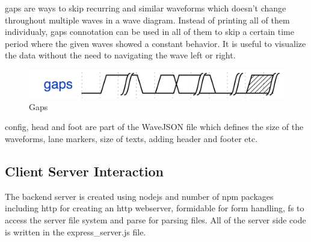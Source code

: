 \documentclass[14pt]{extarticle}
\begin{document}
gaps are ways to skip recurring and similar waveforms which doesn't change throughout multiple waves in a wave diagram. Instead of printing all of them individualy, gaps connotation can be used in all of them to skip a certain time period where the given waves showed a constant behavior. It is useful to visualize the data without the need to navigating the wave left or right.

\begin{figure}[H]
    \centering
    \includegraphics[scale=0.7]{gaps}
    \caption{Gaps}
    \label{fig:gaps}
\end{figure}

config, head and foot are part of the WaveJSON file which defines the size of the waveforms, lane markers, size of texts, adding header and footer etc.

\subsection{Client Server Interaction}
The backend server is created using nodejs and number of npm packages including http for creating an http webserver, formidable for form handling, fs to access the server file system and parse for parsing files. All of the server side code is written in the express\_server.js file.
\end{document}
